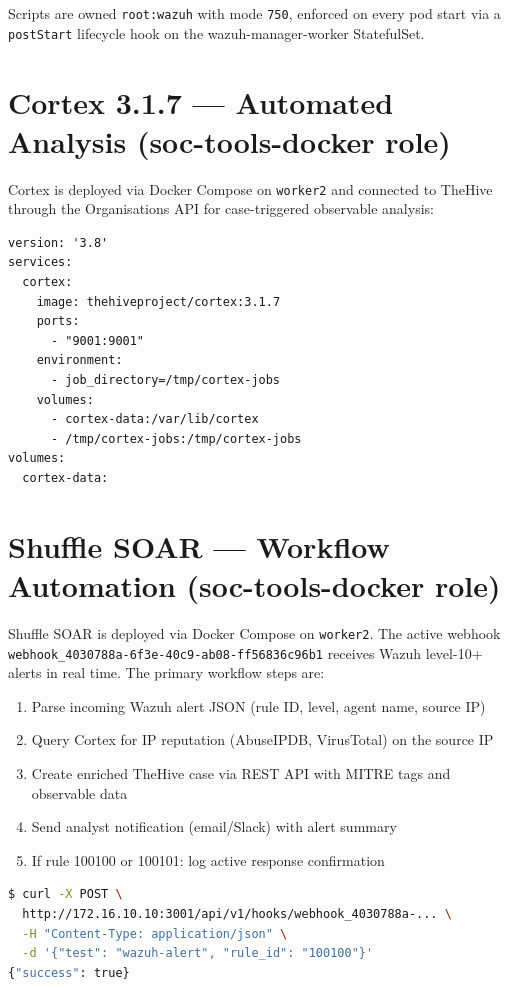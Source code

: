 \documentclass[12pt,a4paper]{report}
\begin{document}
Scripts are owned \texttt{root:wazuh} with mode \texttt{750}, enforced on every pod start via a \texttt{postStart} lifecycle hook on the wazuh-manager-worker StatefulSet.

\section{Cortex 3.1.7 --- Automated Analysis (soc-tools-docker role)}

Cortex is deployed via Docker Compose on \texttt{worker2} and connected to TheHive through the Organisations API for case-triggered observable analysis:

\begin{lstlisting}[style=yamlstyle, caption=Cortex Docker Compose configuration, style=yamlstyle]
version: '3.8'
services:
  cortex:
    image: thehiveproject/cortex:3.1.7
    ports:
      - "9001:9001"
    environment:
      - job_directory=/tmp/cortex-jobs
    volumes:
      - cortex-data:/var/lib/cortex
      - /tmp/cortex-jobs:/tmp/cortex-jobs
volumes:
  cortex-data:
\end{lstlisting}

\section{Shuffle SOAR --- Workflow Automation (soc-tools-docker role)}

Shuffle SOAR is deployed via Docker Compose on \texttt{worker2}. The active webhook \texttt{webhook\_4030788a-6f3e-40c9-ab08-ff56836c96b1} receives Wazuh level-10+ alerts in real time. The primary workflow steps are:

\begin{enumerate}
  \item Parse incoming Wazuh alert JSON (rule ID, level, agent name, source IP)
  \item Query Cortex for IP reputation (AbuseIPDB, VirusTotal) on the source IP
  \item Create enriched TheHive case via REST API with MITRE tags and observable data
  \item Send analyst notification (email/Slack) with alert summary
  \item If rule 100100 or 100101: log active response confirmation
\end{enumerate}

\begin{lstlisting}[language=bash, caption=Shuffle webhook test]
$ curl -X POST \
  http://172.16.10.10:3001/api/v1/hooks/webhook_4030788a-... \
  -H "Content-Type: application/json" \
  -d '{"test": "wazuh-alert", "rule_id": "100100"}'
{"success": true}
\end{lstlisting}
\end{document}
